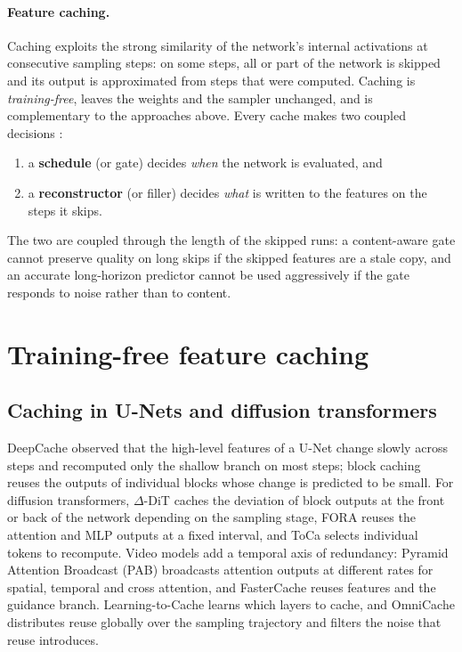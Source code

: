 \paragraph{Feature caching.} Caching exploits the strong similarity of the network's internal activations at consecutive sampling steps: on some steps, all or part of the network is skipped and its output is approximated from steps that were computed. Caching is \emph{training-free}, leaves the weights and the sampler unchanged, and is complementary to the approaches above. Every cache makes two coupled decisions \citep{chung2026seacache}:
\begin{enumerate}
  \item a \textbf{schedule} (or gate) decides \emph{when} the network is evaluated, and
  \item a \textbf{reconstructor} (or filler) decides \emph{what} is written to the features on the steps it skips.
\end{enumerate}
The two are coupled through the length of the skipped runs: a content-aware gate cannot preserve quality on long skips if the skipped features are a stale copy, and an accurate long-horizon predictor cannot be used aggressively if the gate responds to noise rather than to content.

\section{Training-free feature caching}\label{sec:lit-caching}

\subsection{Caching in U-Nets and diffusion transformers}
DeepCache \citep{ma2024deepcache} observed that the high-level features of a U-Net change slowly across steps and recomputed only the shallow branch on most steps; block caching \citep{wimbauer2024blockcache} reuses the outputs of individual blocks whose change is predicted to be small. For diffusion transformers, $\Delta$-DiT \citep{chen2024deltadit} caches the deviation of block outputs at the front or back of the network depending on the sampling stage, FORA \citep{selvaraju2024fora} reuses the attention and MLP outputs at a fixed interval, and ToCa \citep{zou2025toca} selects individual tokens to recompute. Video models add a temporal axis of redundancy: Pyramid Attention Broadcast (PAB) \citep{zhao2024pab} broadcasts attention outputs at different rates for spatial, temporal and cross attention, and FasterCache \citep{lv2025fastercache} reuses features and the guidance branch. Learning-to-Cache \citep{ma2024l2c} learns which layers to cache, and OmniCache \citep{chu2025omnicache} distributes reuse globally over the sampling trajectory and filters the noise that reuse introduces.

